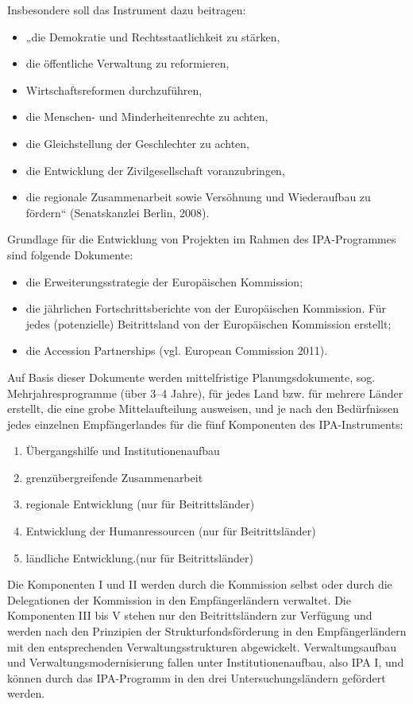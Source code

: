 Insbesondere soll das Instrument dazu beitragen:
\begin{itemize}
\item „die Demokratie und Rechtsstaatlichkeit zu stärken,
\item die öffentliche Verwaltung zu reformieren,
\item Wirtschaftsreformen durchzuführen,
\item die Menschen- und Minderheitenrechte zu achten,
\item die Gleichstellung der Geschlechter zu achten,
\item die Entwicklung der Zivilgesellschaft voranzubringen,
\item die regionale Zusammenarbeit sowie Versöhnung und Wiederaufbau zu fördern“ (Senatskanzlei Berlin, 2008). 
\end{itemize}
Grundlage für die Entwicklung von Projekten im Rahmen des IPA-Programmes sind folgende Dokumente:
\begin{itemize}
\item die Erweiterungsstrategie der Europäischen Kommission;
\item die jährlichen Fortschrittsberichte von der Europäischen Kommission. Für jedes (potenzielle) Beitrittsland von der Europäischen Kommission erstellt;
\item die Accession Partnerships (vgl. European Commission 2011).
\end{itemize}
Auf Basis dieser Dokumente werden mittelfristige Planungsdokumente, sog. Mehrjahresprogramme (über 3–4 Jahre), für jedes Land bzw. für mehrere Länder erstellt, die eine grobe Mittelaufteilung ausweisen, und je nach den Bedürfnissen jedes einzelnen Empfängerlandes für die fünf Komponenten des IPA-Instruments:
\begin{enumerate}[label=IPA {\roman*}:,align=left,  leftmargin=*]
\item Übergangshilfe und Institutionenaufbau
\item  grenzübergreifende Zusammenarbeit
\item regionale Entwicklung (nur für Beitrittsländer)
\item Entwicklung der Humanressourcen (nur für Beitrittsländer)
\item ländliche Entwicklung.(nur für Beitrittsländer)
\end{enumerate}
Die Komponenten I und II werden durch die Kommission selbst oder durch die Delegationen der Kommission in den Empfängerländern verwaltet. Die Komponenten III bis V stehen nur den Beitrittsländern zur Verfügung und werden nach den Prinzipien der Strukturfondsförderung in den Empfängerländern mit den entsprechenden Verwaltungsstrukturen abgewickelt. Verwaltungsaufbau und Verwaltungsmodernisierung fallen unter Institutionenaufbau, also IPA I, und können durch das IPA-Programm in den drei Untersuchungsländern gefördert werden.\par

